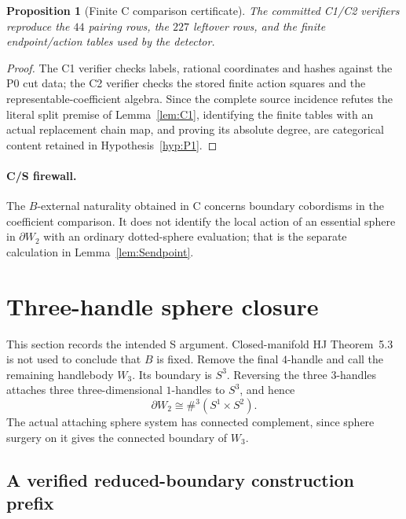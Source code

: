 \documentclass[11pt]{amsart}
\newtheorem{proposition}[theorem]{Proposition}
\theoremstyle{definition}
\theoremstyle{remark}
\begin{document}
\begin{proposition}[Finite C comparison certificate]\label{thm:Cdischarge}
The committed C1/C2 verifiers reproduce the $44$ pairing rows, the $227$
leftover rows, and the finite endpoint/action tables used by the detector.
\end{proposition}

\begin{proof}
The C1 verifier checks labels, rational coordinates and hashes against the P0
cut data; the C2 verifier checks the stored finite action squares and the
representable-coefficient algebra.  Since the complete source incidence
refutes the literal split premise of Lemma~\ref{lem:C1}, identifying the
finite tables with an actual replacement chain map, and proving its absolute
degree, are categorical content retained in Hypothesis~\ref{hyp:P1}.
\end{proof}

\paragraph{C/S firewall.}
The $B$-external naturality obtained in C concerns boundary cobordisms in
the coefficient comparison.  It does not identify the local action of an
essential sphere in $\partial W_2$ with an ordinary dotted-sphere evaluation;
that is the separate calculation in Lemma~\ref{lem:Sendpoint}.

\section{Three-handle sphere closure}\label{sec:s-closure}

This section records the intended S argument.  Closed-manifold HJ
Theorem~5.3 is not used to conclude that $B$ is fixed.  Remove the final $4$-handle and call the
remaining handlebody $W_3$.  Its boundary is $S^3$.  Reversing the three
$3$-handles attaches three three-dimensional $1$-handles to $S^3$, and hence
\[
\partial W_2\cong\#^3(S^1\times S^2).
\]
The actual attaching sphere system has connected complement, since sphere
surgery on it gives the connected boundary of $W_3$.

\subsection{A verified reduced-boundary construction prefix}
\end{document}
